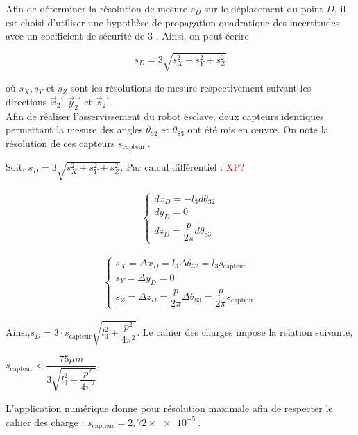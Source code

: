 Afin de déterminer la résolution de mesure $s_{D}$ sur le déplacement du point $D$, il est choisi d'utiliser une hypothèse de propagation quadratique des incertitudes avec un coefficient de sécurité de 3 . Ainsi, on peut écrire

$$
s_{D}=3 \sqrt{s_{X}^{2}+s_{Y}^{2}+s_{Z}^{2}}
$$

où $s_{X}, s_{Y}$ et $s_{Z}$ sont les résolutions de mesure respectivement suivant les directions $\vec{x}_{2}{ }^{\prime}, \vec{y}_{2}{ }^{\prime}$ et $\vec{z}_{2}{ }^{\prime}$.\\
Afin de réaliser l'asservissement du robot esclave, deux capteurs identiques permettant la mesure des angles $\theta_{32}$ et $\theta_{83}$ ont été mis en œuvre. On note la résolution de ces capteurs $s_{\text {capteur }}$.\\

\ifprof
\begin{corrige}
Soit, $s_D=3\sqrt{s_X^2+s_Y^2+s_Z^2}$. Par calcul différentiel :  \textcolor{red}{XP?}

\begin{minipage}{0.5\textwidth}
\begin{align*}
\left\{
\begin{array}{c}
dx_D=-l_3d\theta_{32}\\
dy_D=0\\
dz_D=\dfrac{p}{2\pi}d\theta_{83}
\end{array}
\right.
\end{align*}
\end{minipage}
\begin{minipage}{0.5\textwidth}

\begin{align*}
\left\{
\begin{array}{c}
s_X=\Delta x_D=l_3\Delta \theta_{32}=l_3 s_{\text{capteur}}\\
s_Y=\Delta y_D=0\\
s_Z=\Delta z_D=\dfrac{p}{2\pi}\Delta \theta_{83}=\dfrac{p}{2\pi}s_{\text{capteur}}
\end{array}
\right.
\end{align*}
\end{minipage}

Ainsi,$
s_D=3\cdot s_{\text{capteur}}\sqrt{l_3^2+\dfrac{p^2}{4\pi^2}}
$.
Le cahier des charges impose la relation suivante,

$
s_{\text{capteur}}<\dfrac{75\mu m}{3\sqrt{l_3^2+\dfrac{p^2}{4\pi^2}}}
$.

L'application numérique donne pour résolution maximale afin de respecter le cahier des charge :  $s_{\text{capteur}}=2,72\times \SI{e-5}{}$.
\end{corrige}
\else
\fi


